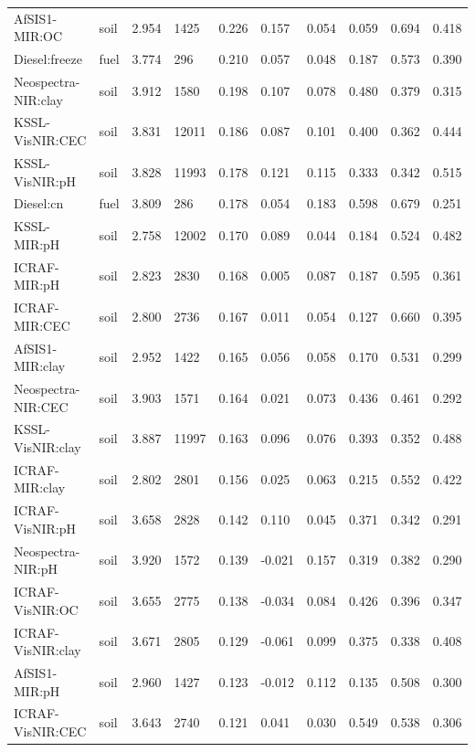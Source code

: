 \begin{tabular}{llllllllll}
AfSIS1-MIR:OC & soil & 2.954 & 1425 & 0.226 & 0.157 & 0.054 & 0.059 & 0.694 & 0.418 \\
Diesel:freeze & fuel & 3.774 & 296 & 0.210 & 0.057 & 0.048 & 0.187 & 0.573 & 0.390 \\
Neospectra-NIR:clay & soil & 3.912 & 1580 & 0.198 & 0.107 & 0.078 & 0.480 & 0.379 & 0.315 \\
KSSL-VisNIR:CEC & soil & 3.831 & 12011 & 0.186 & 0.087 & 0.101 & 0.400 & 0.362 & 0.444 \\
KSSL-VisNIR:pH & soil & 3.828 & 11993 & 0.178 & 0.121 & 0.115 & 0.333 & 0.342 & 0.515 \\
Diesel:cn & fuel & 3.809 & 286 & 0.178 & 0.054 & 0.183 & 0.598 & 0.679 & 0.251 \\
KSSL-MIR:pH & soil & 2.758 & 12002 & 0.170 & 0.089 & 0.044 & 0.184 & 0.524 & 0.482 \\
ICRAF-MIR:pH & soil & 2.823 & 2830 & 0.168 & 0.005 & 0.087 & 0.187 & 0.595 & 0.361 \\
ICRAF-MIR:CEC & soil & 2.800 & 2736 & 0.167 & 0.011 & 0.054 & 0.127 & 0.660 & 0.395 \\
AfSIS1-MIR:clay & soil & 2.952 & 1422 & 0.165 & 0.056 & 0.058 & 0.170 & 0.531 & 0.299 \\
Neospectra-NIR:CEC & soil & 3.903 & 1571 & 0.164 & 0.021 & 0.073 & 0.436 & 0.461 & 0.292 \\
KSSL-VisNIR:clay & soil & 3.887 & 11997 & 0.163 & 0.096 & 0.076 & 0.393 & 0.352 & 0.488 \\
ICRAF-MIR:clay & soil & 2.802 & 2801 & 0.156 & 0.025 & 0.063 & 0.215 & 0.552 & 0.422 \\
ICRAF-VisNIR:pH & soil & 3.658 & 2828 & 0.142 & 0.110 & 0.045 & 0.371 & 0.342 & 0.291 \\
Neospectra-NIR:pH & soil & 3.920 & 1572 & 0.139 & -0.021 & 0.157 & 0.319 & 0.382 & 0.290 \\
ICRAF-VisNIR:OC & soil & 3.655 & 2775 & 0.138 & -0.034 & 0.084 & 0.426 & 0.396 & 0.347 \\
ICRAF-VisNIR:clay & soil & 3.671 & 2805 & 0.129 & -0.061 & 0.099 & 0.375 & 0.338 & 0.408 \\
AfSIS1-MIR:pH & soil & 2.960 & 1427 & 0.123 & -0.012 & 0.112 & 0.135 & 0.508 & 0.300 \\
ICRAF-VisNIR:CEC & soil & 3.643 & 2740 & 0.121 & 0.041 & 0.030 & 0.549 & 0.538 & 0.306 \\
\hline
\end{tabular}
